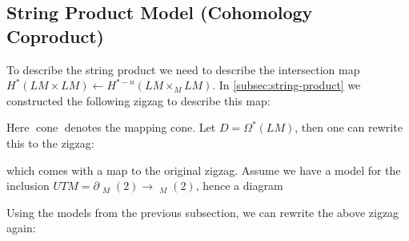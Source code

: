 \documentclass{scrartcl}
\theoremstyle{plain}
\theoremstyle{definition}
\DeclareMathOperator{\cone}{cone}
\newcommand{\quiso}{\simeq}
\newcommand{\from}{\leftarrow}
\DeclareMathOperator{\cConf}{\overline{Conf}}
\begin{document}
\subsection{String Product Model (Cohomology Coproduct)}
To describe the string product we need to describe the intersection map $H^*(LM\times LM) \from H^{*-n}(LM\times_M LM)$. In \ref{subsec:string-product} we constructed the following zigzag to describe this map:
\begin{center}
\end{center}
Here $\cone$ denotes the mapping cone. Let $D = \Omega^*(LM)$, then one can rewrite this to the zigzag: 
\begin{center}
\end{center}
which comes with a map to the original zigzag. Assume we have a model for the inclusion $UTM = \partial \cConf_M(2)\to \cConf_M(2)$, hence a diagram
\begin{center}
\end{center} 
Using the models from the previous subsection, we can rewrite the above zigzag again:
\begin{center}
\end{center}
\end{document}
